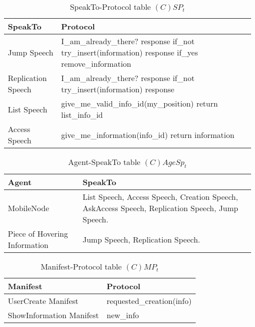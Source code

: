 \begin{table}[H]
	\centering
	\begin{tabular}{|p{4cm}|p{8cm}|}
			\hline
			\textbf{SpeakTo} & \textbf{Protocol} \\
			\hline
			Jump Speech & I\_am\_already\_there? \newline response \newline if\_not
			try\_insert(information) \newline response \newline if\_yes remove\_information \\
			\hline
			Replication Speech & I\_am\_already\_there? \newline response \newline if\_not
			try\_insert(information) \newline response \\
			\hline
			List Speech & give\_me\_valid\_info\_id(my\_position) \newline return list\_info\_id\\
			\hline
			Access Speech & give\_me\_information(info\_id) \newline return information \\
			\hline
		\end{tabular}
	\caption{SpeakTo-Protocol table $(C)SP_t$}
	\label{tab:cspt}
\end{table}

\begin{table}[H]
	\centering
	\begin{tabular}{|p{4cm}|p{8cm}|}
			\hline
			\textbf{Agent} & \textbf{SpeakTo} \\
			\hline
			MobileNode & List Speech, Access Speech, Creation Speech, AskAccess Speech, Replication Speech, Jump Speech. \\
			\hline
			Piece of Hovering Information & Jump Speech, Replication Speech. \\
			\hline
		\end{tabular}
	\caption{Agent-SpeakTo table $(C)AgeSp_t$}
	\label{tab:cagespt}
\end{table}

\begin{table}[H]
	\centering
	\begin{tabular}{|p{4cm}|p{8cm}|}
			\hline
			\textbf{Manifest} & \textbf{Protocol} \\
			\hline
			UserCreate Manifest & requested\_creation(info) \\
			\hline
			ShowInformation Manifest & new\_info \\
			\hline
		\end{tabular}
	\caption{Manifest-Protocol table $(C)MP_t$}
	\label{tab:cmpt}
\end{table}

